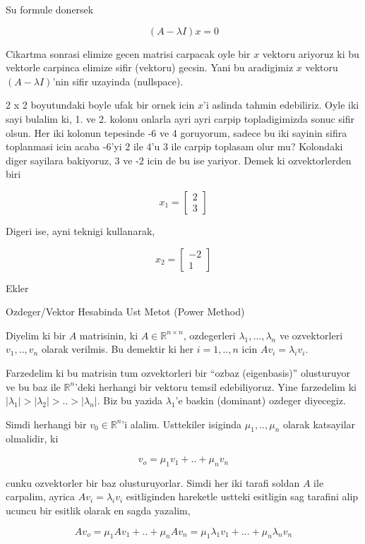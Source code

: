\documentclass[12pt,fleqn]{article}\usepackage{../common}
\begin{document}
Su formule donersek

\[ (A - \lambda I) x = 0 \]

Cikartma sonrasi elimize gecen matrisi carpacak oyle bir $x$ vektoru
ariyoruz ki bu vektorle carpinca elimize sifir (vektoru) gecsin. Yani bu
aradigimiz $x$ vektoru $(A - \lambda I)$'nin sifir uzayinda (nullspace). 

2 x 2 boyutundaki boyle ufak bir ornek icin $x$'i aslinda tahmin
edebiliriz. Oyle iki sayi bulalim ki, 1. ve 2. kolonu onlarla ayri ayri
carpip topladigimizda sonuc sifir olsun. Her iki kolonun tepesinde -6 ve 4
goruyorum, sadece bu iki sayinin sifira toplanmasi icin acaba -6'yi 2 ile
4'u 3 ile carpip toplasam olur mu? Kolondaki diger sayilara bakiyoruz, 3 ve
-2 icin de bu ise yariyor. Demek ki ozvektorlerden biri 

\[ x_1 = 
\left[\begin{array}{r}
2 \\ 3
\end{array}\right]
 \]

Digeri ise, ayni teknigi kullanarak,

\[ x_2 = 
\left[\begin{array}{r}
-2 \\ 1
\end{array}\right]
 \]

Ekler

Ozdeger/Vektor Hesabinda Ust Metot (Power Method)

Diyelim ki bir $A$ matrisinin, ki $A \in \mathbb{R}^{n \times n}$,
ozdegerleri $\lambda_1,...,\lambda_n$ ve ozvektorleri $v_1,..,v_n$ olarak
verilmis. Bu demektir ki her $i=1,..,n$ icin $Av_i = \lambda_i v_i$.

Farzedelim ki bu matrisin tum ozvektorleri bir ``ozbaz (eigenbasis)''
olusturuyor ve bu baz ile $\mathbb{R}^n$'deki herhangi bir vektoru temsil
edebiliyoruz. Yine farzedelim ki $|\lambda_1| > |\lambda_2| > .. >
|\lambda_n| $. Biz bu yazida $\lambda_1$'e 
baskin (dominant) ozdeger diyecegiz.

Simdi herhangi bir $v_0 \in \mathbb{R}^n$'i alalim. Usttekiler isiginda
$\mu_1,..,\mu_n$ olarak katsayilar olmalidir, ki 

$$ v_o = \mu_1v_1 + .. + \mu_nv_n 
$$

cunku ozvektorler bir baz olusturuyorlar. Simdi her iki tarafi soldan $A$
ile carpalim, ayrica $Av_i = \lambda_iv_i$ esitliginden hareketle ustteki
esitligin sag tarafini alip ucuncu bir esitlik olarak en sagda yazalim,

$$ A v_o = \mu_1 A v_1 + .. + \mu_n A v_n =
\mu_1\lambda_1v_1 + ... + \mu_n\lambda_nv_n
$$
\end{document}
